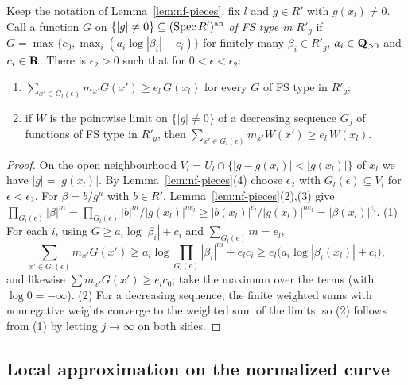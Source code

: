 \begin{lemma}\label{lem:nf-pieces-fs}
\leanok
{}
Keep the notation of Lemma~\ref{lem:nf-pieces}, fix $l$ and $g\in R'$ with $g(x_l)\ne0$. Call a function $G$ on
$\{|g|\ne0\}\subseteq(\operatorname{Spec} R')^{\mathrm{an}}$ \emph{of FS type in $R'_g$} if $G=\max\{c_0,\max_i(a_i\log|\beta_i|+c_i)\}$ for
finitely many $\beta_i\in R'_g$, $a_i\in\mathbf{Q}_{>0}$ and $c_i\in\mathbf{R}$. There is $\epsilon_2>0$ such that for $0<\epsilon<\epsilon_2$:
\begin{enumerate}
\item $\sum_{x'\in G_l(\epsilon)}m_{x'}G(x')\ge e_l\,G(x_l)$ for every $G$ of FS type in $R'_g$;
\item if $W$ is the pointwise limit on $\{|g|\ne0\}$ of a decreasing sequence $G_j$ of functions of FS type in $R'_g$, then
$\sum_{x'\in G_l(\epsilon)}m_{x'}W(x')\ge e_l\,W(x_l)$.
\end{enumerate}
\end{lemma}

\begin{proof}
On the open neighbourhood $V_l=U_l\cap\{|g-g(x_l)|<|g(x_l)|\}$ of $x_l$ we have $|g|=|g(x_l)|$. By
Lemma~\ref{lem:nf-pieces}(4) choose $\epsilon_2$ with $G_l(\epsilon)\subseteq V_l$ for $\epsilon<\epsilon_2$. For
$\beta=b/g^n$ with $b\in R'$, Lemma~\ref{lem:nf-pieces}(2),(3) give
$\prod_{G_l(\epsilon)}|\beta|^{m}=\prod_{G_l(\epsilon)}|b|^m/|g(x_l)|^{ne_l}\ge|b(x_l)|^{e_l}/|g(x_l)|^{ne_l}=|\beta(x_l)|^{e_l}$.
(1) For each $i$, using $G\ge a_i\log|\beta_i|+c_i$ and $\sum_{G_l(\epsilon)}m=e_l$,
\[
\sum_{x'\in G_l(\epsilon)}m_{x'}G(x')\ge a_i\log\prod_{G_l(\epsilon)}|\beta_i|^{m}+e_lc_i\ge e_l\bigl(a_i\log|\beta_i(x_l)|+c_i\bigr),
\]
and likewise $\sum m_{x'}G(x')\ge e_lc_0$; take the maximum over the terms (with $\log0=-\infty$). (2) For a decreasing
sequence, the finite weighted sums with nonnegative weights converge to the weighted sum of the limits, so (2) follows
from (1) by letting $j\to\infty$ on both sides.
\end{proof}

\subsection{Local approximation on the normalized curve}\label{subsec:nf-local}

